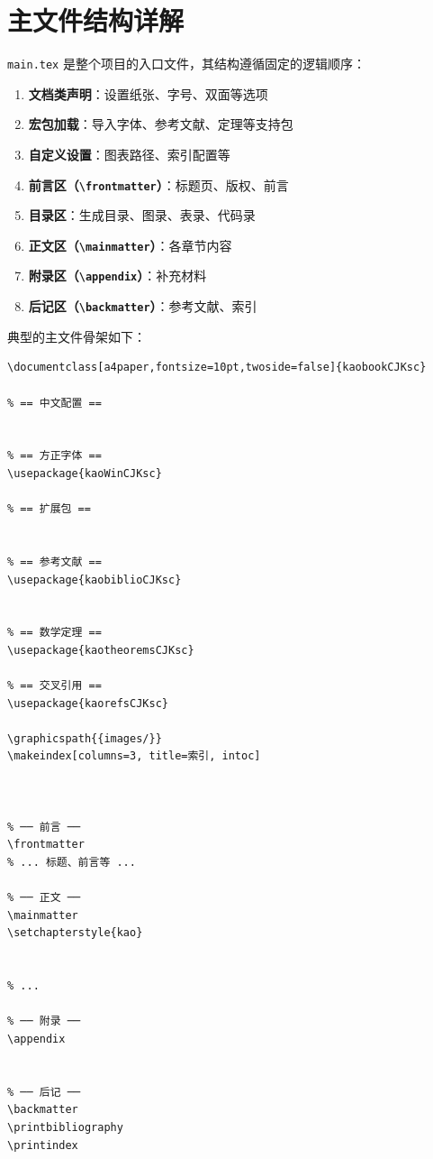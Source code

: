 \section{主文件结构详解}


\texttt{main.tex} 是整个项目的入口文件，其结构遵循固定的逻辑顺序：

\begin{enumerate}
    \item \textbf{文档类声明}：设置纸张、字号、双面等选项
    \item \textbf{宏包加载}：导入字体、参考文献、定理等支持包
    \item \textbf{自定义设置}：图表路径、索引配置等
    \item \textbf{前言区（\texttt{\textbackslash frontmatter}）}：标题页、版权、前言
    \item \textbf{目录区}：生成目录、图录、表录、代码录
    \item \textbf{正文区（\texttt{\textbackslash mainmatter}）}：各章节内容
    \item \textbf{附录区（\texttt{\textbackslash appendix}）}：补充材料
    \item \textbf{后记区（\texttt{\textbackslash backmatter}）}：参考文献、索引
\end{enumerate}

典型的主文件骨架如下：

\begin{lstlisting}
\documentclass[a4paper,fontsize=10pt,twoside=false]{kaobookCJKsc}

% == 中文配置 ==


% == 方正字体 ==
\usepackage{kaoWinCJKsc}

% == 扩展包 ==


% == 参考文献 ==
\usepackage{kaobiblioCJKsc}


% == 数学定理 ==
\usepackage{kaotheoremsCJKsc}

% == 交叉引用 ==
\usepackage{kaorefsCJKsc}

\graphicspath{{images/}}
\makeindex[columns=3, title=索引, intoc]



% ── 前言 ──
\frontmatter
% ... 标题、前言等 ...

% ── 正文 ──
\mainmatter
\setchapterstyle{kao}


% ...

% ── 附录 ──
\appendix


% ── 后记 ──
\backmatter
\printbibliography
\printindex


\end{lstlisting}

